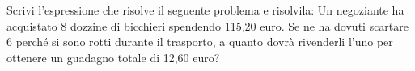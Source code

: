 \item Scrivi l'espressione che risolve il seguente problema e risolvila: Un negoziante ha acquistato 8 dozzine di bicchieri spendendo 115,20 euro. Se ne ha dovuti scartare 6 perché si sono rotti durante il trasporto, a quanto dovrà rivenderli l'uno per ottenere un guadagno totale di 12,60 euro?